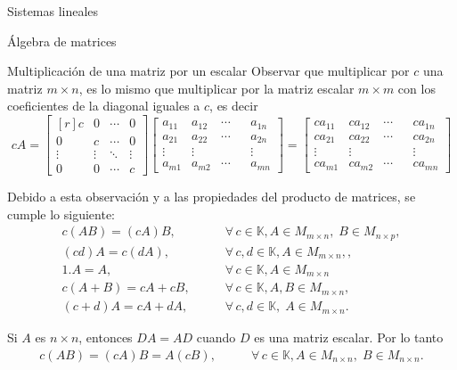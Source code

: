 \documentclass[a4paper,12pt,twoside,spanish,reqno]{amsbook}
\numberwithin{equation}{section}
\theoremstyle{definition}
\theoremstyle{remark}
\newcommand{\K}{\mathbb K}
\begin{document}
\begin{chapter}{Sistemas lineales}
\begin{section}{Álgebra de matrices}
\begin{subsection}{Multiplicación de una matriz por un escalar}
        Observar que multiplicar por $c$ una matriz $m \times n$,  es lo mismo que multiplicar por la matriz escalar $m \times m$ con los coeficientes de la diagonal iguales a $c$,  es decir
        \begin{equation}
            cA = \begin{bmatrix*}[r]
            c     &     0& \cdots & 0\\
            0     &     c& \cdots & 0\\
            \vdots&\vdots&  \ddots      &\vdots\\
            0     &    0  & \cdots & c
            \end{bmatrix*}
             \begin{bmatrix}
            a_{11}&a_{12}& \cdots & & a_{1n}\\
            a_{21}&a_{22}& \cdots & &a_{2n}\\
            \vdots&\vdots&  & &\vdots\\
            a_{m1}&a_{m2}& \cdots & & a_{mn}
            \end{bmatrix} =
             \begin{bmatrix}
            ca_{11}&ca_{12}& \cdots & & ca_{1n}\\
            ca_{21}&ca_{22}& \cdots & &ca_{2n}\\
            \vdots&\vdots&  & &\vdots\\
            ca_{m1}&ca_{m2}& \cdots & & ca_{mn}
            \end{bmatrix}
        \end{equation}
        
        Debido a esta observación y a las propiedades del producto de matrices, se cumple lo siguiente:
            \begin{align*}
             c(A B) = (cA) B,\qquad &\forall\, c \in \K,  A \in M_{m \times n}, \;B \in M_{n \times p}, \\
             (cd)A = c(dA),  \qquad &\forall\, c,d \in \K,  A \in M_{m \times n},, \\
            1.A = A ,\qquad&\forall\, c \in \K, A \in M_{m \times n}\\
            c(A + B) = cA + cB,\qquad& \forall\, c \in \K, A,B \in M_{m \times n}, \\
            (c+ d)A = cA + dA,\qquad& \forall\, c,d \in \K, \; A \in M_{m \times n}.
            \end{align*}
            
            Si $A$ es $n \times n$,  entonces $DA = AD$ cuando $D$  es una matriz escalar. Por lo tanto
            \begin{align*}
            c(A B) = (cA) B = A(cB),\qquad &\forall\, c \in \K,  A \in M_{n \times n}, \;B \in M_{n \times n}.
            \end{align*} 


\end{subsection}
\end{section}
\end{chapter}
\end{document}
